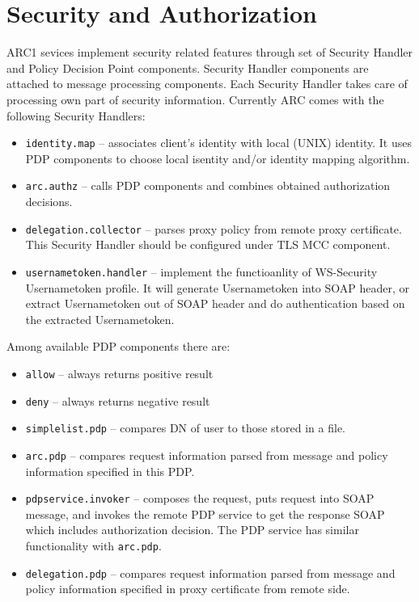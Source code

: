 \documentclass{article}                            %
\begin{document}
\section{Security and Authorization}
\label{sec:security}

ARC1 sevices implement security related features through set of Security Handler
and Policy Decision Point components. Security Handler components are attached
to message processing components. Each Security Handler takes care of processing
own part of security information. Currently ARC comes with the following
Security Handlers:

\begin{itemize}
 \item \texttt{identity.map} -- associates client's identity with local (UNIX)
identity. It uses PDP components to choose local isentity and/or identity
mapping algorithm.
\item \texttt{arc.authz} -- calls PDP components and combines
obtained authorization decisions.
\item \texttt{delegation.collector} -- parses proxy policy from remote proxy
certificate. This Security Handler should be configured under TLS MCC component.
\item \texttt{usernametoken.handler} -- implement the functioanlity
of WS-Security Usernametoken profile. It will generate Usernametoken
into SOAP header, or extract Usernametoken out of SOAP header and
do authentication based on the extracted Usernametoken.
\end{itemize}

Among available PDP components there are:
\begin{itemize}
\item \texttt{allow} -- always returns positive result
\item \texttt{deny} -- always returns negative result
\item  \texttt{simplelist.pdp} -- compares DN of user to those stored in a file.
\item  \texttt{arc.pdp} -- compares request information parsed from message and
policy information specified in this PDP.
\item  \texttt{pdpservice.invoker} -- composes the request, puts request into
SOAP message, and invokes the remote PDP service to get the response SOAP
which includes authorization decision. The PDP service has similar
functionality with \texttt{arc.pdp}.
 \item \texttt{delegation.pdp} -- compares request information parsed from
message and policy information specified in proxy certificate from remote side.
\end{itemize}
\end{document}
